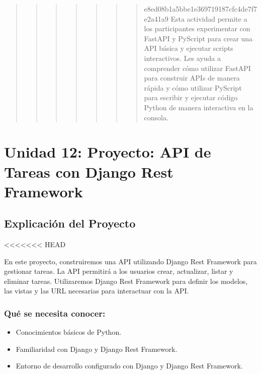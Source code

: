 \documentclass[
  a4paper,
  DIV=11,
  numbers=noendperiod,
  onepage,
  openany]{scrreprt}
\providecommand{\tightlist}{%
  \setlength{\itemsep}{0pt}\setlength{\parskip}{0pt}}\usepackage{longtable,booktabs,array}
\begin{document}
\begin{quote}
\begin{quote}
\begin{quote}
\begin{quote}
\begin{quote}
\begin{quote}
\begin{quote}
e8ed08b1a5bbe1e369719187cfc4de7f7e2a41a9 Esta actividad permite a los
participantes experimentar con FastAPI y PyScript para crear una API
básica y ejecutar scripts interactivos. Les ayuda a comprender cómo
utilizar FastAPI para construir APIs de manera rápida y cómo utilizar
PyScript para escribir y ejecutar código Python de manera interactiva en
la consola.
\end{quote}
\end{quote}
\end{quote}
\end{quote}
\end{quote}
\end{quote}
\end{quote}

\part{Unidad 12: Proyecto: API de Tareas con Django Rest Framework}

\hypertarget{explicaciuxf3n-del-proyecto}{%
\chapter{Explicación del Proyecto}\label{explicaciuxf3n-del-proyecto}}

\textless\textless\textless\textless\textless\textless\textless{} HEAD

En este proyecto, construiremos una API utilizando Django Rest Framework
para gestionar tareas. La API permitirá a los usuarios crear,
actualizar, listar y eliminar tareas. Utilizaremos Django Rest Framework
para definir los modelos, las vistas y las URL necesarias para
interactuar con la API.

\hypertarget{quuxe9-se-necesita-conocer}{%
\section{Qué se necesita conocer:}\label{quuxe9-se-necesita-conocer}}

\begin{itemize}
\tightlist
\item
  Conocimientos básicos de Python.
\item
  Familiaridad con Django y Django Rest Framework.
\item
  Entorno de desarrollo configurado con Django y Django Rest Framework.
\end{itemize}
\end{document}
